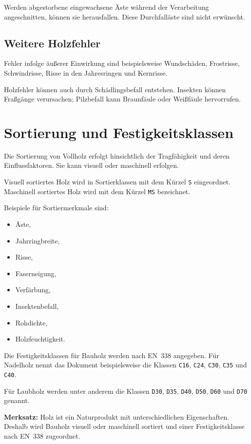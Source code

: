 \documentclass[
  12pt,
  a4paper,
  oneside
]{scrreprt}
\begin{document}
Werden abgestorbene eingewachsene Äste während der Verarbeitung
angeschnitten, können sie herausfallen. Diese Durchfalläste sind nicht
erwünscht. 

\subsection{Weitere Holzfehler}

Fehler infolge äußerer Einwirkung sind beispielsweise Wundschäden,
Frostrisse, Schwindrisse, Risse in den Jahresringen und Kernrisse.


Holzfehler können auch durch Schädlingsbefall entstehen. Insekten können
Fraßgänge verursachen; Pilzbefall kann Braunfäule oder Weißfäule
hervorrufen. 

\section{Sortierung und Festigkeitsklassen}

Die Sortierung von Vollholz erfolgt hinsichtlich der Tragfähigkeit und
deren Einflussfaktoren. Sie kann visuell oder maschinell erfolgen.


Visuell sortiertes Holz wird in Sortierklassen mit dem Kürzel
\texttt{S} eingeordnet. Maschinell sortiertes Holz wird mit dem Kürzel
\texttt{MS} bezeichnet. 

Beispiele für Sortiermerkmale sind:

\begin{itemize}
  \item Äste,
  \item Jahrringbreite,
  \item Risse,
  \item Faserneigung,
  \item Verfärbung,
  \item Insektenbefall,
  \item Rohdichte,
  \item Holzfeuchtigkeit.
\end{itemize}



Die Festigkeitsklassen für Bauholz werden nach EN~338 angegeben. Für
Nadelholz nennt das Dokument beispielsweise die Klassen \texttt{C16},
\texttt{C24}, \texttt{C30}, \texttt{C35} und \texttt{C40}.


Für Laubholz werden unter anderem die Klassen \texttt{D30},
\texttt{D35}, \texttt{D40}, \texttt{D50}, \texttt{D60} und
\texttt{D70} genannt. 

\begin{merksatzbox}
\textbf{Merksatz:}
Holz ist ein Naturprodukt mit unterschiedlichen Eigenschaften. Deshalb
wird Bauholz visuell oder maschinell sortiert und einer
Festigkeitsklasse nach EN~338 zugeordnet.

\end{merksatzbox}
\end{document}

